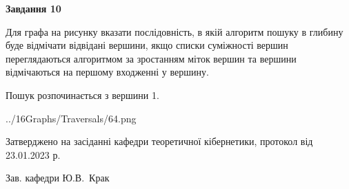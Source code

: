 \documentclass[12pt, ukrainian]{article}
\begin{document}
{\begin {large}
{\begin {center}\textbf{Завдання 10}\end {center}}\par
Для графа на рисунку вказати послідовність, в якій алгоритм пошуку в глибину буде відмічати відвідані вершини, якщо списки суміжності вершин переглядаються алгоритмом за зростанням міток вершин та вершини відмічаються на першому вход\-женні у вершину.\par
Пошук розпочинається з вершини 1.\par

\begin{center}
	{../16Graphs/Traversals/64.png}
\end{center}\par
\newpage


\end {large}
}
{\smallskip \begin {small} Затверджено на засіданні кафедри теоретичної кібернетики, протокол  від   23.01.2023 р.\par\smallskip\smallskip
{\parbox {6.5 cm}{Зав. кафедри \dotfill Ю.В.~Крак}} \end{small}}
\end{document}
